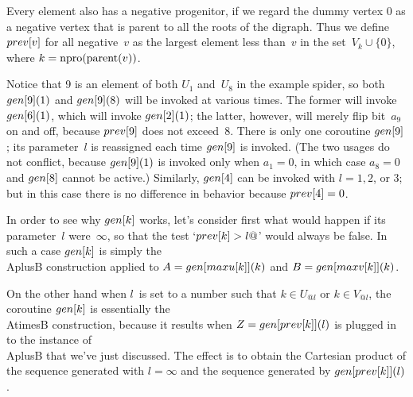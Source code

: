 Every element also has a negative progenitor, if we regard
the dummy vertex 0 as a negative vertex that is parent to
all the roots of the digraph.  Thus we define $\\{prev}[v]$ for
all negative~$v$ as the largest element less than~$v$ in the
set~$V_k\cup\{0\}$, where $k={\rm npro(parent}(v))$.

Notice that 9 is an element of both $U_1$ and~$U_8$ in the
example spider, so both 
$\\{gen}[9](1)$ and $\\{gen}[9](8)$ will be invoked at
various times.  The former will invoke $\\{gen}[6](1)$,
which will invoke $\\{gen}[2](1)$; the latter, however,
will merely flip bit~$a_9$ on and off, because $\\{prev}[9]$ does
not exceed~8.  There is only one coroutine $\\{gen}[9]$; its
parameter~$l$ is reassigned each time $\\{gen}[9]$ is
invoked.  (The two usages do not conflict, because
\vadjust{\goodbreak}%
$\\{gen}[9](1)$ is invoked only when $a_1=0$, in which case
$a_8=0$ and $\\{gen}[8]$ cannot be active.)  Similarly,
$\\{gen}[4]$ can be invoked with $l=1,2$, or $3$; but in
this case there is no difference in behavior because 
$\\{prev}[4]=0$.

In order to see why $\\{gen}[k]$ works, let's consider first
what would happen if its parameter~$l$ were~$\infty$, so
that the test `$\\{prev}[k]>l@$' would always be false.  In
such a case $\\{gen}[k]$ is simply the \\{AplusB}
construction applied to 
$A=\\{gen}[\\{maxu}[k]](k)$ and $B=\\{gen}[\\{maxv}[k]](k)$.

On the other hand when 
$l$~is set to a number such that $k\in U_{@l}$ or $k\in
V_{@l}$, the coroutine $\\{gen}[k]$ is essentially the \\{AtimesB}
construction, because it results when $Z=\\{gen}[\\{prev}[k]](l)$ is
plugged in to the instance of \\{AplusB} that we've just discussed.
The effect is to obtain the Cartesian product of the sequence
generated with $l=\infty$ and the sequence generated by
$\\{gen}[\\{prev}[k]](l)$.

